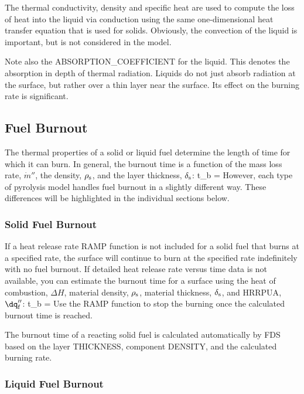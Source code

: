 \documentclass[11pt]{book}
\begin{document}
The thermal conductivity, density and specific heat are used to
compute the loss of heat into the liquid via conduction using the
same one-dimensional heat transfer equation that is used for solids. Obviously,
the convection of the liquid is important, but is not considered in
the model.

Note also the {\ct ABSORPTION\_COEFFICIENT} for the liquid. This
denotes the absorption in depth of thermal radiation. Liquids do not
just absorb radiation at the surface, but rather over a thin layer
near the surface. Its effect on the burning rate is significant.

\subsection{Fuel Burnout}

The thermal properties of a solid or liquid fuel determine the length of time for which it can burn. In general, the
burnout time is a function of the mass loss rate, $\dot{m}''$, the density, $\rho_{\rm s}$, and the
layer thickness, $\delta_{\rm s}$:
\be t_{\rm b} =  \ee
However, each type of pyrolysis model handles fuel burnout in a slightly different way. These differences will be
highlighted in the individual sections below.

\subsubsection{Solid Fuel Burnout}

If a heat release rate {\ct RAMP} function is not included for a solid fuel that burns at a specified rate, the surface will continue to
burn at the specified rate indefinitely with no fuel burnout.  If detailed heat release rate versus time data is not available, you
can estimate the burnout time for a surface using the heat of combustion, $\Delta H$,
material density, $\rho_{\rm s}$, material thickness, $\delta_{\rm s}$, and {\ct HRRPUA}, $\dq_{\rm f}''$:
\be t_{\rm b} =  \ee
Use the {\ct RAMP} function to stop the burning once the calculated burnout time is reached.

The burnout time of a reacting solid fuel is calculated automatically by FDS based on the
layer {\ct THICKNESS}, component {\ct DENSITY}, and the calculated burning rate.


\subsubsection{Liquid Fuel Burnout}
\end{document}
